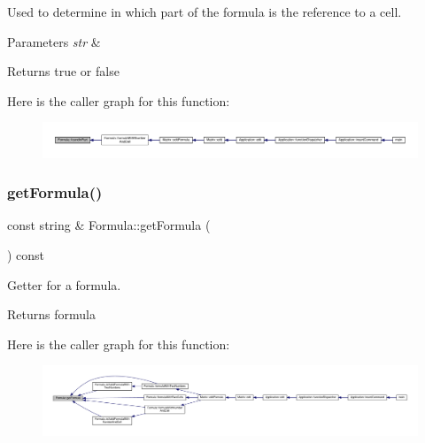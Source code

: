 Used to determine in which part of the formula is the reference to a cell. 
\begin{DoxyParams}{Parameters}
{\em str} & \\
\hline
\end{DoxyParams}
\begin{DoxyReturn}{Returns}
true or false 
\end{DoxyReturn}
Here is the caller graph for this function\+:\nopagebreak
\begin{figure}[H]
\begin{center}
\leavevmode
\includegraphics[width=350pt]{class_formula_a79079cea46f8320cd7a63f576251baac_icgraph}
\end{center}
\end{figure}
\mbox{\label{class_formula_a1b9557287ed502f9523c5c7b1805bac1}} 
\subsubsection{\texorpdfstring{get\+Formula()}{getFormula()}}
{\footnotesize\ttfamily const string \& Formula\+::get\+Formula (\begin{DoxyParamCaption}{ }\end{DoxyParamCaption}) const}

Getter for a formula. \begin{DoxyReturn}{Returns}
formula 
\end{DoxyReturn}
Here is the caller graph for this function\+:\nopagebreak
\begin{figure}[H]
\begin{center}
\leavevmode
\includegraphics[width=350pt]{class_formula_a1b9557287ed502f9523c5c7b1805bac1_icgraph}
\end{center}
\end{figure}
\mbox{\label{class_formula_a8080ff3cf8fce2d9f1730e772ae21c71}} 
